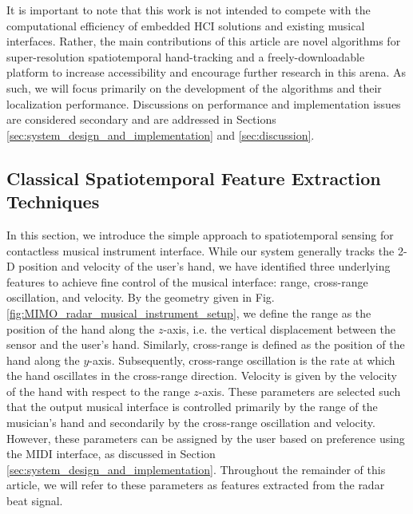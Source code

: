 \documentclass[10pt,journal,final]{IEEEtran}
\begin{document}
It is important to note that this work is not intended to compete with the computational efficiency of embedded HCI solutions and existing musical interfaces. 
Rather, the main contributions of this article are novel algorithms for super-resolution spatiotemporal hand-tracking and a freely-downloadable platform to increase accessibility and encourage further research in this arena. 
As such, we will focus primarily on the development of the algorithms and their localization performance.
Discussions on performance and implementation issues are considered secondary and are addressed in Sections \ref{sec:system_design_and_implementation} and \ref{sec:discussion}.

\subsection{Classical Spatiotemporal Feature Extraction Techniques}
\label{subsec:classical_gesture_tracking}
In this section, we introduce the simple approach to spatiotemporal sensing for contactless musical instrument interface.
While our system generally tracks the 2-D position and velocity of the user's hand, we have identified three underlying features to achieve fine control of the musical interface: range, cross-range oscillation, and velocity. 
By the geometry given in Fig. \ref{fig:MIMO_radar_musical_instrument_setup}, we define the range as the position of the hand along the $z$-axis, i.e. the vertical displacement between the sensor and the user's hand. 
Similarly, cross-range is defined as the position of the hand along the $y$-axis.
Subsequently, cross-range oscillation is the rate at which the hand oscillates in the cross-range direction.
Velocity is given by the velocity of the hand with respect to the range $z$-axis. 
These parameters are selected such that the output musical interface is controlled primarily by the range of the musician's hand and secondarily by the cross-range oscillation and velocity.
However, these parameters can be assigned by the user based on preference using the MIDI interface, as discussed in Section \ref{sec:system_design_and_implementation}.
Throughout the remainder of this article, we will refer to these parameters as features extracted from the radar beat signal.
\end{document}
